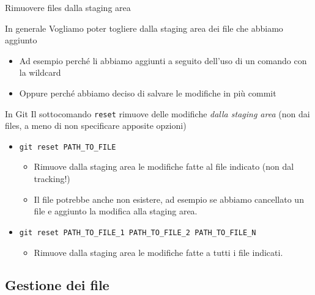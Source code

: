 \documentclass[presentation]{beamer}
\begin{document}
\begin{frame}{Rimuovere files dalla staging area}
	\begin{block}{In generale}	
		Vogliamo poter togliere dalla staging area dei file che abbiamo aggiunto
		\begin{itemize}
			\item Ad esempio perché li abbiamo aggiunti a seguito dell'uso di un comando con la 
wildcard
			\item Oppure perché abbiamo deciso di salvare le modifiche in più commit
		\end{itemize}
	\end{block}
	\begin{block}{In Git}
		Il sottocomando \texttt{reset} rimuove delle modifiche \textit{dalla staging area} (non dai 
files, a meno di non specificare apposite opzioni)
		\begin{itemize}
			\item \texttt{git reset PATH\_TO\_FILE}
			\begin{itemize}
				\item Rimuove dalla staging area le modifiche fatte al file indicato (non dal 
tracking!)
				\item Il file potrebbe anche non esistere, ad esempio se abbiamo cancellato un file 
e aggiunto la modifica alla staging area.
			\end{itemize}
			\item \texttt{git reset PATH\_TO\_FILE\_1 PATH\_TO\_FILE\_2 PATH\_TO\_FILE\_N}
			\begin{itemize}
				\item Rimuove dalla staging area le modifiche fatte a tutti i file indicati.
			\end{itemize}
		\end{itemize}
	\end{block}
\end{frame}

\subsection{Gestione dei file}
\end{document}
